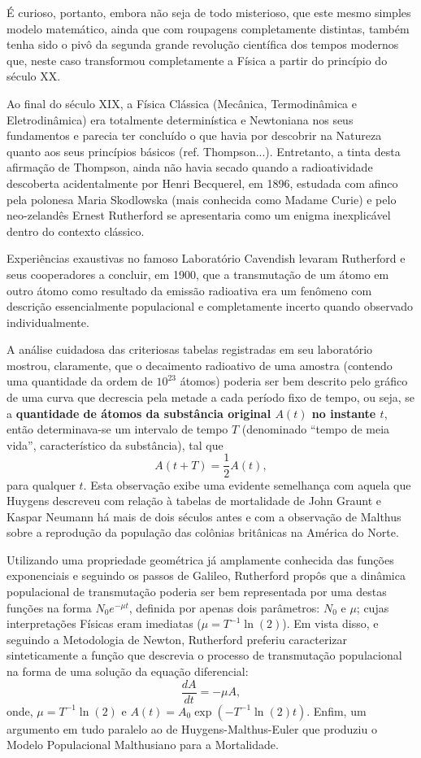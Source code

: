     É curioso, portanto, embora não seja de todo misterioso, que este mesmo simples modelo matemático, ainda que com roupagens completamente distintas, também tenha sido o pivô da segunda grande revolução científica dos tempos modernos que, neste caso transformou completamente a Física a partir do princípio do século XX.

    Ao final do século XIX, a Física Clássica (Mecânica, Termodinâmica e Eletrodinâmica) era totalmente determinística e Newtoniana nos seus fundamentos e parecia ter concluído o que havia por descobrir na Natureza quanto aos seus princípios básicos (ref. Thompson...). Entretanto, a tinta desta afirmação de Thompson, ainda não havia secado quando a radioatividade descoberta acidentalmente por Henri Becquerel, em 1896, estudada com afinco pela polonesa Maria Skodlowska (mais conhecida como Madame Curie) e pelo neo-zelandês Ernest Rutherford se apresentaria como um enigma inexplicável dentro do contexto clássico.
    
    Experiências exaustivas no famoso Laboratório Cavendish levaram Rutherford e seus cooperadores a concluir, em 1900, que a transmutação de um átomo em outro átomo como resultado da emissão radioativa era um fenômeno com descrição essencialmente populacional e completamente incerto quando observado individualmente.
    
    A análise cuidadosa das criteriosas tabelas registradas em seu laboratório mostrou, claramente, que o decaimento radioativo de uma amostra (contendo uma quantidade da ordem de \(10^{23}\) átomos) poderia ser bem descrito pelo gráfico de uma curva que decrescia pela metade a cada período fixo de tempo, ou seja, se a \textbf{quantidade de átomos da substância original \(A(t)\) no instante \(t\)}, então determinava-se um intervalo de tempo \(T\) (denominado ``tempo de meia vida'', característico da substância), tal que
    \[A(t+T) = \dfrac{1}{2} A(t),\]
    para qualquer \(t\). Esta observação exibe uma evidente semelhança com aquela que Huygens descreveu com relação à tabelas de mortalidade de John Graunt e Kaspar Neumann há mais de dois séculos antes e com a observação de Malthus sobre a reprodução da população das colônias britânicas na América do Norte.

    Utilizando uma propriedade geométrica já amplamente conhecida das funções exponenciais e seguindo os passos de Galileo, Rutherford propôs que a dinâmica populacional de transmutação poderia ser bem representada por uma destas funções na forma \(N_0 e^{-\mu t}\), definida por apenas dois parâmetros: \(N_0\) e \(\mu\); cujas interpretações Físicas eram imediatas (\(\mu = T^{-1}\ln(2)\)). Em vista disso, e seguindo a Metodologia de Newton, Rutherford preferiu caracterizar sinteticamente a função que descrevia o processo de transmutação populacional na forma de uma solução da equação diferencial:
    \[\dfrac{dA}{dt} = -\mu A,\]
    onde, \(\mu = T^{-1}\ln(2)\) e \(A(t) = A_0 \exp(-T^{-1}\ln(2) t)\). Enfim, um argumento em tudo paralelo ao de Huygens-Malthus-Euler que produziu o Modelo Populacional Malthusiano para a Mortalidade.

